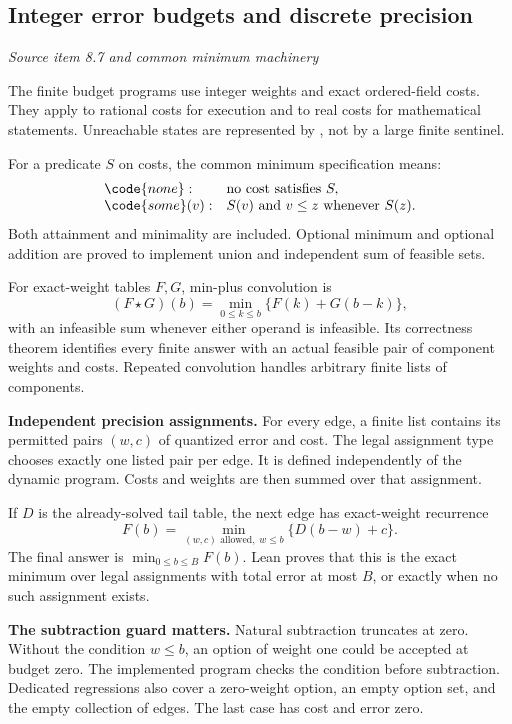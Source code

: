 \subsection{Integer error budgets and discrete precision}\label{supp3:subsection:004}\textit{Source item 8.7 and common minimum machinery}\par
The finite budget programs use integer weights and exact ordered-field costs. They apply to rational costs for execution and to real costs for mathematical statements. Unreachable states are represented by , not by a large finite sentinel.

For a predicate $S$ on costs, the common minimum specification means:
\[
\begin{array}{ll}
\code{none}: & \text{no cost satisfies }S,\\
\code{some}(v): & S(v)\text{ and }v\leq z\text{ whenever }S(z).
\end{array}
\]
Both attainment and minimality are included. Optional minimum and optional addition are proved to implement union and independent sum of feasible sets.

For exact-weight tables $F,G$, min-plus convolution is
\[
(F\star G)(b)=\min_{0\leq k\leq b}\{F(k)+G(b-k)\},
\]
with an infeasible sum whenever either operand is infeasible. Its correctness theorem identifies every finite answer with an actual feasible pair of component weights and costs. Repeated convolution handles arbitrary finite lists of components.

\textbf{Independent precision assignments.} For every edge, a finite list contains its permitted pairs $(w,c)$ of quantized error and cost. The legal assignment type chooses exactly one listed pair per edge. It is defined independently of the dynamic program. Costs and weights are then summed over that assignment.

If $D$ is the already-solved tail table, the next edge has exact-weight recurrence
\[
F(b)=\min_{(w,c)\text{ allowed},\;w\leq b}\{D(b-w)+c\}.
\]
The final answer is $\min_{0\leq b\leq B}F(b)$. Lean proves that this is the exact minimum over legal assignments with total error at most $B$, or  exactly when no such assignment exists.

\textbf{The subtraction guard matters.} Natural subtraction truncates at zero. Without the condition $w\leq b$, an option of weight one could be accepted at budget zero. The implemented program checks the condition before subtraction. Dedicated regressions also cover a zero-weight option, an empty option set, and the empty collection of edges. The last case has cost and error zero.

